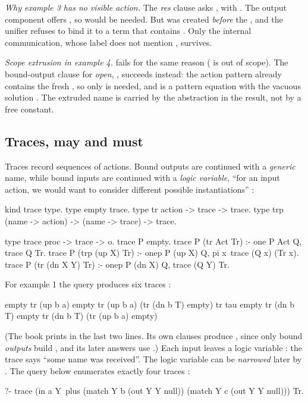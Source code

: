 {{\begin{tutorial}
\smallskip\noindent\emph{Why example 3 has no visible action.} The \emph{res} clause asks
, with . The output component
offers , so  would be needed. But  was created \emph{before} the
, and the unifier refuses to bind it to a term that contains . Only the internal
communication, whose label  does not mention , survives.


\smallskip\noindent\emph{Scope extrusion in example 4.}  fails for the same reason
( is out of scope). The bound-output clause for \emph{open},
, succeeds instead: the action pattern
 already contains the fresh , so only  is needed, and
 is a pattern equation with the vacuous solution . The extruded
name is carried by the abstraction in the result, not by a free constant.
\end{tutorial}

\subsection{Traces, may and must}\label{sec:apps-pi-traces}

Traces record sequences of actions. Bound outputs are continued with a \emph{generic} name, while bound
inputs are continued with a \emph{logic variable}, ``for an input action, we would want to consider
different possible instantiations'' :

\begin{lprolog}
kind trace  type.
type empty  trace.
type tr     action -> trace -> trace.
type trp    (name -> action) -> (name -> trace) -> trace.

type trace  proc -> trace -> o.
trace P empty.
trace P (tr Act Tr)     :- one P Act Q, trace Q Tr.
trace P (trp (up X) Tr) :- onep P (up X) Q,
                           pi x\ trace (Q x) (Tr x).
trace P (tr (dn X Y) Tr) :- onep P (dn X) Q, trace (Q Y) Tr.
\end{lprolog}

\noindent For example 1 the query  produces six traces :
\begin{lprolog}
empty
tr (up b a) empty
tr (up b a) (tr (dn b T) empty)
tr tau empty
tr (dn b T) empty
tr (dn b T) (tr (up b a) empty)
\end{lprolog}
\noindent (The book prints  in the last two lines. Its own clauses produce
, since only bound \emph{outputs} build , and its later  answers
use .) Each input leaves a logic variable : the trace says ``some name was
received''. The logic variable can be \emph{narrowed} later by . The query below enumerates exactly
four traces :
\begin{lprolog}
?- trace (in a Y\ plus (match Y b (out Y Y null))
                       (match Y c (out Y Y null))) Tr.


\end{lprolog}}}
